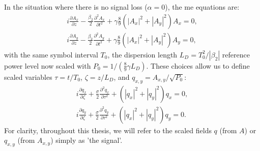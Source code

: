 In the situation where there is no signal loss ($\alpha = 0$), the \Gls{me} equations are:
\begin{gather} 
i \frac{\partial A_x}{\partial z} - \frac{\beta_2}{2}\frac{\partial^2 A_x}{\partial t^2} + \gamma\frac{8}{9}\left(|A_x|^2 + |A_y|^2\right) A_x = 0, \nonumber \\
i \frac{\partial A_y}{\partial z} - \frac{\beta_2}{2}\frac{\partial^2 A_y}{\partial t^2} + \gamma\frac{8}{9}\left(|A_x|^2 + |A_y|^2\right) A_y = 0,
\label{eq:manakov}
\end{gather}
with the same symbol interval \( T_0 \), the dispersion length \( L_D = T_0^2/|\beta_2| \) reference power level now scaled with \( P_0=1/(\frac{8}{9} \gamma L_D) \). These choices allow us to define scaled variables \( \tau=t/T_0 \), \( \zeta=z/L_D \), and \( q_{x,y}=A_{x,y}/\sqrt{P_0} \):
\begin{gather} 
i \frac{\partial q_x}{\partial \zeta} + \frac{\sigma}{2}\frac{\partial^2 q_x}{\partial \tau^2} +  \left(|q_x|^2 + |q_y|^2\right) q_x = 0, \nonumber \\
i \frac{\partial q_y}{\partial \zeta} + \frac{\sigma}{2}\frac{\partial^2 q_y}{\partial \tau^2} + \left(|q_x|^2 + |q_y|^2\right) q_y = 0.
\label{eq:manakov_norm}
\end{gather}
For clarity, throughout this thesis, we will refer to the scaled fields \( q \) (from \( A \)) or \( q_{x,y} \) (from \( A_{x,y} \)) simply as 'the signal'.





